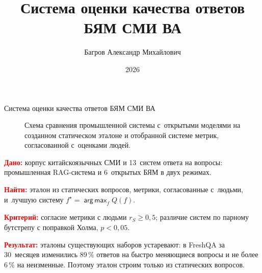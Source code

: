 \documentclass[t]{beamer}
\title[ВКР\quad\textbullet\quad ВМК МГУ\quad\textbullet\quad 2026]{Система оценки качества ответов БЯМ СМИ ВА}
\author[А.\,М.~Багров (alexbagrov04@gmail.com)]{Багров Александр Михайлович}
\date{2026}
\newcommand{\key}[1]{\textcolor{red}{\textbf{#1}}}  %
\let\mathrm\mathsf  %
\newcommand{\Lm}{\mathcal{L}}
\newcommand{\Heval}{\mathcal{H}_{\mathrm{eval}}}
\newcommand{\ldraft}{\ell_{\mathrm{draft}}}
\newcommand{\gdraft}{g_{\mathrm{draft}}}
\newcommand{\refuse}{\bot}
\DeclareMathOperator*{\argmax}{arg\,max}
\begin{document}
\begin{frame}{Система оценки качества ответов БЯМ СМИ ВА}
    \vspace{-1.2ex}
    \begin{figure}
    \caption{Схема сравнения промышленной системы с~открытыми моделями на созданном статическом эталоне и отобранной системе метрик, согласованной с~оценками людей.}
    \end{figure}
    \vspace{-1.5ex}
    \small
    \key{Дано:} корпус китайскоязычных СМИ и 13~систем ответа на вопросы: промышленная RAG-система и 6~открытых БЯМ в двух режимах.

    \smallskip
    \key{Найти:} эталон из статических вопросов, метрики, согласованные с~людьми, и~лучшую систему $f^\star=\argmax_f Q(f)$.

    \smallskip
    \key{Критерий:} согласие метрики с людьми $r_S\ge0{,}5$; различие систем по парному бутстрепу с поправкой Холма, $p<0{,}05$.

    \smallskip
    \key{Результат:} эталоны существующих наборов устаревают: в FreshQA за 30~месяцев изменились 89\,\% ответов на быстро меняющиеся вопросы и не более 6\,\% на неизменные. Поэтому эталон строим только из статических вопросов.
\end{frame}
\end{document}
